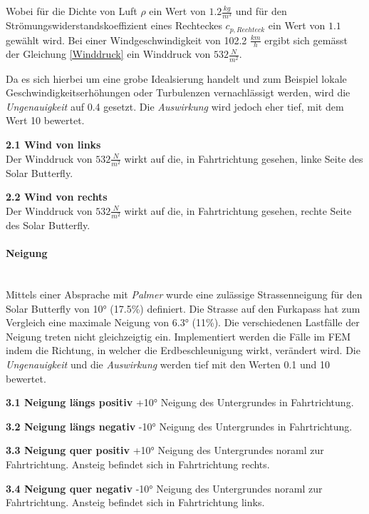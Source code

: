  Wobei für die Dichte von Luft $\rho$ ein Wert von $1.2 \frac{kg}{m^3}$ und für den Strömungswiderstandskoeffizient eines Rechteckes $c_{p,Rechteck}$ ein Wert von $1.1$ gewählt wird. Bei einer Windgeschwindigkeit von 102.2 $\frac{km}{h}$ ergibt sich gemässt der Gleichung \ref{Winddruck} ein Winddruck von $532 \frac{N}{m^2}$.

  Da es sich hierbei um eine grobe Idealsierung handelt und zum Beispiel lokale Geschwindigkeitserhöhungen oder Turbulenzen vernachlässigt werden, wird die \emph{Ungenauigkeit} auf 0.4 gesetzt. Die \emph{Auswirkung} wird jedoch eher tief, mit dem Wert 10 bewertet.

  \begin{description}
    \item \textbf{2.1 Wind von links}\\ Der Winddruck von $532 \frac{N}{m^2}$ wirkt auf die, in Fahrtrichtung gesehen, linke Seite des Solar Butterfly.
    \item \textbf{2.2 Wind von rechts}\\ Der Winddruck von $532 \frac{N}{m^2}$ wirkt auf die, in Fahrtrichtung gesehen, rechte Seite des Solar Butterfly.
  \end{description}

  \paragraph{Neigung}\mbox{}\\
  Mittels einer Absprache mit \emph{Palmer} wurde eine zulässige Strassenneigung für den Solar Butterfly von 10° (17.5\%) definiert. Die Strasse auf den Furkapass hat zum Vergleich eine maximale Neigung von 6.3° (11\%). Die verschiedenen Lastfälle der Neigung treten nicht gleichzeigtig ein. Implementiert werden die Fälle im FEM indem die Richtung, in welcher die Erdbeschleunigung wirkt, verändert wird. Die \emph{Ungenauigkeit} und die \emph{Auswirkung} werden tief mit den Werten 0.1  und 10 bewertet.

  \begin{description}
    \item \textbf{3.1 Neigung längs positiv} +10° Neigung des Untergrundes in Fahrtrichtung.
    \item \textbf{3.2 Neigung längs negativ} -10° Neigung des Untergrundes in Fahrtrichtung.
    \item \textbf{3.3 Neigung quer positiv} +10° Neigung des Untergrundes noraml zur Fahrtrichtung. Ansteig befindet sich in Fahrtrichtung rechts.
    \item \textbf{3.4 Neigung quer negativ} -10° Neigung des Untergrundes noraml zur Fahrtrichtung. Ansteig befindet sich in Fahrtrichtung links.
  \end{description}

